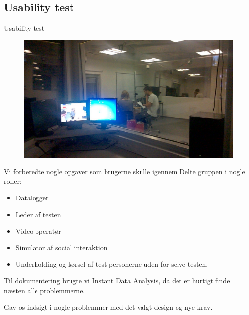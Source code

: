 \subsection{Usability test}
\begin{frame}{Usability test}
	\begin{figure}
		\centering
		\includegraphics[width=\textwidth/2]{slides/Heider/subjectRoom}
	\end{figure}
	Vi forberedte nogle opgaver som brugerne skulle igennem
	Delte gruppen i nogle roller:
	\begin{itemize}
		\item Datalogger
		\item Leder af testen
		\item Video operatør
		\item Simulator af social interaktion
		\item Underholding og kørsel af test personerne uden for selve testen.
	\end{itemize}
	Til dokumentering brugte vi Instant Data Analysis, da det er hurtigt finde næsten alle problemmerne.

	Gav os indsigt i nogle problemmer med det valgt design og nye krav.
\end{frame}
